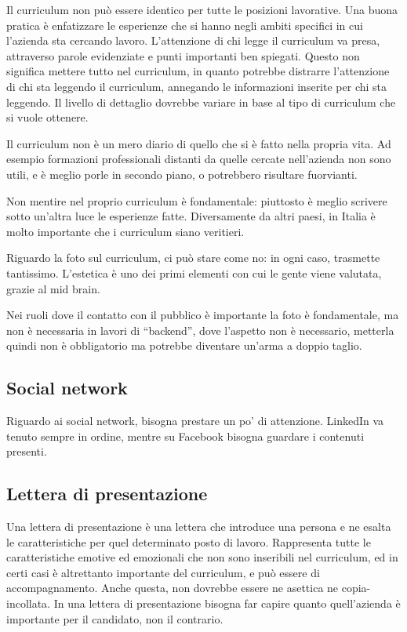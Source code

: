 Il curriculum non può essere identico per tutte le posizioni lavorative. Una
buona pratica è enfatizzare le esperienze che si hanno negli ambiti specifici
in cui l'azienda sta cercando lavoro. L'attenzione di chi legge il curriculum
va presa, attraverso parole evidenziate e punti importanti ben spiegati. Questo
non significa mettere tutto nel curriculum, in quanto potrebbe distrarre
l'attenzione di chi sta leggendo il curriculum, annegando le informazioni
inserite per chi sta leggendo. Il livello di dettaglio dovrebbe variare in base
al tipo di curriculum che si vuole ottenere.

Il curriculum non è un mero diario di quello che si è fatto nella propria vita.
Ad esempio formazioni professionali distanti da quelle cercate nell'azienda non
sono utili, e è meglio porle in secondo piano, o potrebbero risultare
fuorvianti.

Non mentire nel proprio curriculum è fondamentale: piuttosto è
meglio scrivere sotto un'altra luce le esperienze fatte. Diversamente da altri
paesi, in Italia è molto importante che i curriculum siano veritieri.

Riguardo la foto sul curriculum, ci può stare come no: in ogni caso, trasmette
tantissimo. L'estetica è uno dei primi elementi con cui le gente viene
valutata, grazie al mid brain.

Nei ruoli dove il contatto con il pubblico è importante la foto è fondamentale,
ma non è necessaria in lavori di ``backend'', dove l'aspetto non è necessario,
metterla quindi non è obbligatorio ma potrebbe diventare un'arma a doppio
taglio.

\subsection{Social network}
Riguardo ai social network, bisogna prestare un po' di attenzione. LinkedIn va
tenuto sempre in ordine, mentre su Facebook bisogna guardare i contenuti
presenti.

\subsection{Lettera di presentazione}
Una lettera di presentazione è una lettera che introduce una persona e ne
esalta le caratteristiche per quel determinato posto di lavoro. Rappresenta
tutte le caratteristiche emotive ed emozionali che non sono inseribili nel
curriculum, ed in certi casi è altrettanto importante del curriculum, e
può essere di accompagnamento. Anche questa, non dovrebbe essere ne asettica ne
copia-incollata.
In una lettera di presentazione bisogna far capire quanto quell'azienda è
importante per il candidato, non il contrario.
